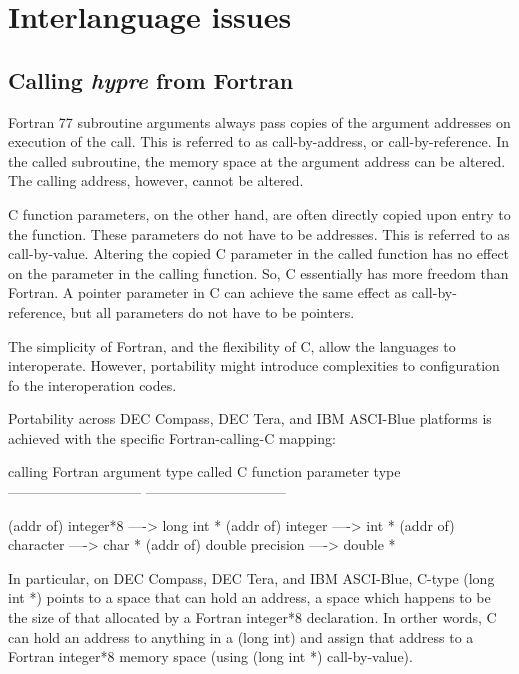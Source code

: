\chapter{Interlanguage issues}

\section{Calling {\itshape hypre} from Fortran}

Fortran 77 subroutine arguments always pass copies of the argument addresses
on execution of the call.  This is referred to as call-by-address, or
call-by-reference.  In the called subroutine, the memory space at the
argument address can be altered.  The calling address, however, cannot be
altered.

C function parameters, on the other hand, are often directly copied upon
entry to the function.  These parameters do not have to be addresses.
This is referred to as call-by-value.  Altering the copied C parameter in the
called function has no effect on the parameter in the calling function.  So,
C essentially has more freedom than Fortran.  A pointer parameter in C can
achieve the same effect as call-by-reference, but all parameters do not have
to be pointers.

The simplicity of Fortran, and the flexibility of C, allow the languages to
interoperate.  However, portability might introduce complexities to
configuration fo the interoperation codes.

Portability across DEC Compass, DEC Tera, and IBM ASCI-Blue platforms is
achieved with the specific Fortran-calling-C mapping: 


  calling Fortran argument type        called C function parameter type
  -----------------------------        ------------------------------

   (addr of) integer*8           ---->            long int *
   (addr of) integer             ---->            int *
   (addr of) character           ---->            char *
   (addr of) double precision    ---->            double *


In particular, on DEC Compass, DEC Tera, and IBM ASCI-Blue, C-type
(long int *) points to a space that can hold an address, a space which
happens to be the size of that allocated by a Fortran integer*8 declaration.
In orther words, C can hold an address to anything in a (long int) and
assign that address to a Fortran integer*8 memory space (using (long int *)
call-by-value).

